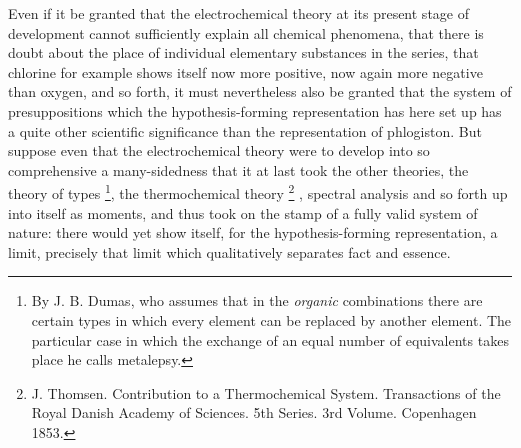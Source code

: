 \documentclass[12pt,a4paper]{book}
\renewcommand{\thefootnote}{*)}
\begin{document}
Even if it be granted that the electrochemical theory at its present stage of development cannot sufficiently explain all
chemical phenomena, that there is doubt about the place of individual elementary substances in the series, that chlorine
for example shows itself now more positive, now again more negative than oxygen, and so forth, it must nevertheless also
be granted that the system of presuppositions which the hypothesis-forming representation has here set up has a quite
other scientific significance than the representation of phlogiston. But suppose even that the electrochemical theory
were to develop into so comprehensive a many-sidedness that it at last took the other theories, the theory of types%
\footnote{%
By J. B. Dumas, who assumes that in the \emph{organic} combinations there are certain types in which every element can be
replaced by another element. The particular case in which the exchange of an equal number of equivalents takes place he
calls metalepsy.}, the thermochemical theory%
\renewcommand{\thefootnote}{**)}%
\footnote{%
J. Thomsen. Contribution to a Thermochemical System. Transactions of the Royal Danish Academy of Sciences. 5th Series.
3rd Volume. Copenhagen 1853.}%
\renewcommand{\thefootnote}{*)}%
, spectral analysis and so forth up into itself as moments, and thus took on the stamp of a fully valid system of nature:
there would yet
show itself, for the hypothesis-forming representation, a limit, precisely that limit which qualitatively separates fact
and essence.
\end{document}
